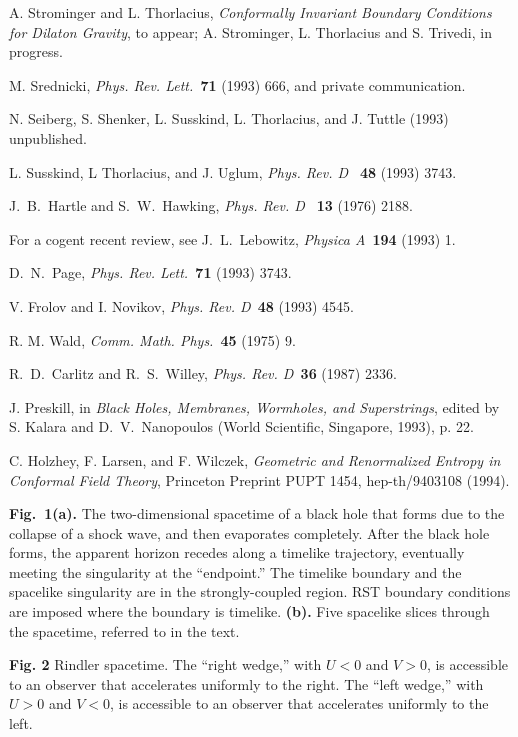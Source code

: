  A. Strominger and L. Thorlacius, {\it Conformally
Invariant
Boundary Conditions for Dilaton Gravity}, to appear;  A. Strominger,
L. Thorlacius and S. Trivedi, in progress.

 M. Srednicki, {\sl Phys. Rev. Lett.\ }{\bf 71} (1993) 666,
and private communication.

 N. Seiberg, S. Shenker, L. Susskind, L. Thorlacius, and J.
Tuttle (1993) unpublished.

 L. Susskind, L Thorlacius, and J. Uglum,
{\sl Phys. Rev. D\ }
{\bf 48} (1993) 3743.

 J.~B.~Hartle and S.~W.~Hawking, {\sl Phys. Rev. D\ }{\bf
13} (1976) 2188.

 For a cogent recent review, see J.~L.~Lebowitz, {\sl Physica
A\ }{\bf 194} (1993) 1.

 D.~N.~Page, {\sl Phys. Rev. Lett.\ }{\bf 71} (1993) 3743.

 V. Frolov and I. Novikov, {\sl Phys. Rev. D\ }{\bf 48} (1993)
4545.

 R. M. Wald, {\sl Comm. Math. Phys.\ }{\bf 45} (1975) 9.

 R.~D.~Carlitz and R.~S.~Willey, {\sl Phys. Rev. D\ }{\bf 36}
(1987) 2336.

 J. Preskill, in {\it Black Holes, Membranes, Wormholes, and
Superstrings}, edited by S. Kalara and D.~V.~Nanopoulos (World Scientific,
Singapore, 1993), p. 22.

 C. Holzhey, F. Larsen, and F. Wilczek, {\it Geometric
and Renormalized Entropy in Conformal Field Theory}, Princeton Preprint PUPT
1454, hep-th/9403108 (1994).

\endreferences
\endit
{}

\item{\bf Fig.~1}{\bf (a).} The two-dimensional spacetime of a black hole that
forms due to the collapse of a shock wave, and then evaporates completely.
After the black hole forms, the apparent horizon recedes along a timelike
trajectory, eventually meeting the singularity at the ``endpoint.''  The
timelike boundary and the spacelike singularity are in the strongly-coupled
region.  RST boundary conditions are imposed where the boundary is timelike.
{\bf (b).} Five spacelike slices through the spacetime, referred to in the
text.

\item{\bf Fig. 2} Rindler spacetime.  The ``right wedge,'' with $U<0$ and
$V>0$, is accessible to an observer that accelerates uniformly to the right.
The ``left wedge,'' with $U>0$ and $V<0$, is accessible to an observer that
accelerates uniformly to the left.

